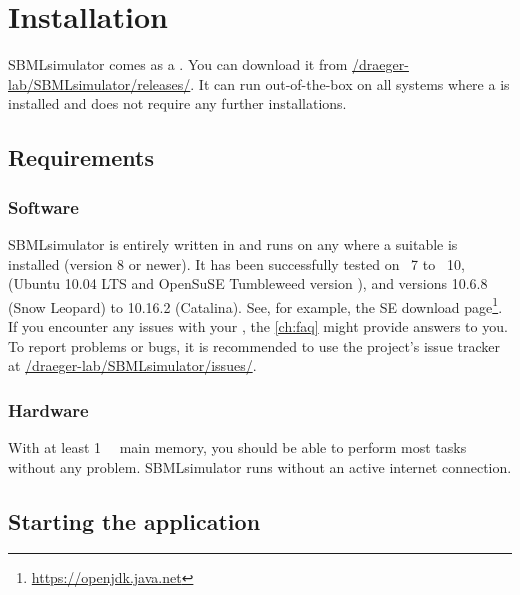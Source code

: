\chapter{Installation}
SBMLsimulator comes as a \JAR.
You can download it from \href{https://github.com/draeger-lab/SBMLsimulator/releases/}{\faGithub/draeger-lab/SBMLsimulator/releases/}.
It can run out-of-the-box on all systems where a \JVM is installed and does not require any further installations.


\section{Requirements}
\subsection{Software}

SBMLsimulator is entirely written in \Java and runs on any \OS
where a suitable \JVM is installed (\JDK version 8 or newer).
It has been successfully tested on \Windows~7 to \Windows~10, \Linux (Ubuntu 10.04 LTS and OpenSuSE Tumbleweed version ), and \MacOSX versions 10.6.8 (Snow Leopard) to 10.16.2 (Catalina).
See, for example, the \Java SE download
page\footnote{\url{https://openjdk.java.net}\label{fn:jvmldl}}.
If you encounter any issues with your \OS, the \vref{ch:faq} might provide answers to you.
To report problems or bugs, it is recommended to use the project's issue tracker at \href{https://github.com/draeger-lab/SBMLsimulator/issues/}{\faGithub/draeger-lab/SBMLsimulator/issues/}.


\subsection{Hardware}

With at least \SI{1}{\giga\byte} main memory, you should be able to perform most tasks
without any problem.
SBMLsimulator runs without an active internet connection.

\section{Starting the application}
\label{startingTheProgram}

